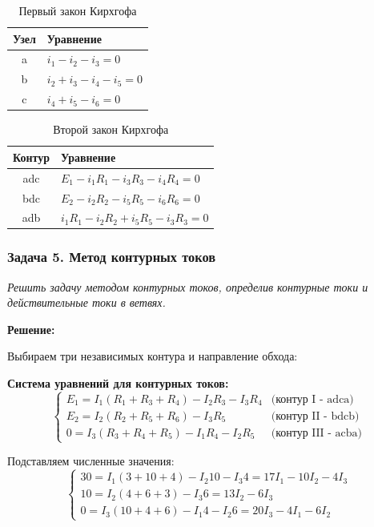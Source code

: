 \begin{table}[H]
\centering
\begin{tabular}{|c|l|}
\hline
\textbf{Узел} & \textbf{Уравнение} \\
\hline
a & $i_1 - i_2 - i_3 = 0$ \\
\hline
b & $i_2 + i_3 - i_4 - i_5 = 0$ \\
\hline
c & $i_4 + i_5 - i_6 = 0$ \\
\hline
\end{tabular}
\caption{Первый закон Кирхгофа}
\label{tab:kirchhoff_first_law}
\end{table}

\begin{table}[H]
\centering
\begin{tabular}{|c|l|}
\hline
\textbf{Контур} & \textbf{Уравнение} \\
\hline
adc & $E_1 - i_1R_1 - i_3R_3 - i_4R_4 = 0$ \\
\hline
bdc & $E_2 - i_2R_2 - i_5R_5 - i_6R_6 = 0$ \\
\hline
adb & $i_1R_1 - i_2R_2 + i_5R_5 - i_3R_3 = 0$ \\
\hline
\end{tabular}
\caption{Второй закон Кирхгофа}
\label{tab:kirchhoff_second_law}
\end{table}



\subsubsection{Задача 5. Метод контурных токов}
\textit{Решить задачу методом контурных токов, определив контурные токи и действительные токи в ветвях.}

\textbf{Решение:}

Выбираем три независимых контура и направление обхода:

\textbf{Система уравнений для контурных токов:}
$$\begin{cases}
E_1 = I_1 (R_1 + R_3 + R_4) - I_2R_3 - I_3R_4 & \text{(контур I - adca)} \\
E_2 = I_2 (R_2 + R_5 + R_6) - I_3R_5 & \text{(контур II - bdcb)} \\
0 = I_3 (R_3 + R_4 + R_5) - I_1R_4 - I_2R_5 & \text{(контур III - acba)}
\end{cases}$$

Подставляем численные значения:
$$\begin{cases}
30 = I_1 (3 + 10 + 4) - I_2 10 - I_3 4 = 17I_1 - 10I_2 - 4I_3 \\
10 = I_2 (4 + 6 + 3) - I_3 6 = 13I_2 - 6I_3 \\
0 = I_3 (10 + 4 + 6) - I_1 4 - I_2 6 = 20I_3 - 4I_1 - 6I_2
\end{cases}$$

